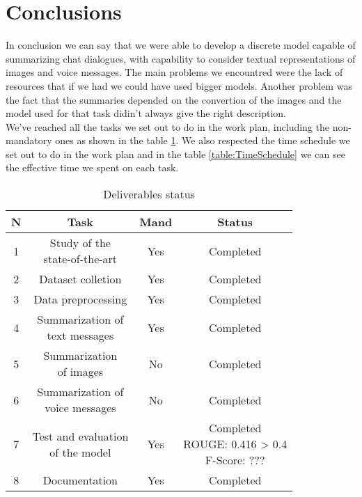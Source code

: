 \documentclass[10pt,twocolumn,letterpaper]{article}
\begin{document}
\section{Conclusions}
In conclusion we can say that we were able to develop a discrete model capable of summarizing chat 
dialogues, with capability to consider textual representations of images and voice messages.
The main problems we encountred were the lack of resources that if we had we could have used bigger models.
Another problem was the fact that the summaries depended on the convertion of the images and the model used for 
that task didin't always give the right description. \\
We've reached all the tasks we set out to do in the work plan, including the non-mandatory ones as shown
in the table \ref{table:Deliverables}. We also respected the time schedule we set out to do in the work plan and in the 
table \ref{table:TimeSchedule} we can see the effective time we spent on each task.
\begin{table}[h!]
    \centering
    \begin{tabular}{|c|c|c|c|}
        \hline
        \rowcolor{lightergray}
        N & Task & Mand & Status\\ 
        \hline
        1 & \makecell{Study of the \\ state-of-the-art } & Yes & Completed \\
        \hline
        2 & Dataset colletion & Yes & Completed \\
        \hline
        3 & Data preprocessing & Yes & Completed \\
        \hline
        4 & \makecell{Summarization of \\ text messages} & Yes & Completed \\
        \hline
        5 & \makecell{Summarization \\ of images} & No & Completed \\
        \hline
        6 & \makecell{Summarization of \\ voice messages} & No & Completed \\
        \hline
        7 & \makecell{Test and evaluation \\ of the model} & Yes & \makecell{Completed \\ ROUGE: 0.416 > 0.4 \\ F-Score: ???} \\
        \hline
        8 & Documentation & Yes & Completed \\
        \hline
    \end{tabular}
    \caption{Deliverables status}
    \label{table:Deliverables}
\end{table}
\end{document}
